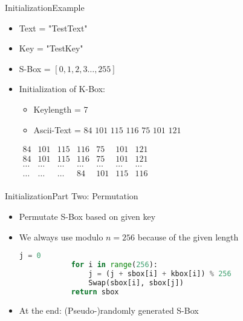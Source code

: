 \documentclass[
	aspectratio=169,	%
	onlytextwidth,		%
	t					%
	]{beamer}
\begin{document}
\begin{frame}{Initialization}{Example}
	\begin{itemize}
		\item Text = "TestText"
		\item Key = "TestKey"
		\item S-Box = $[0, 1, 2, 3 \dots, 255]$
		\item Initialization of K-Box:
		\begin{itemize}
			\item Keylength = 7
			\item Ascii-Text = $84$ $101$ $115$ $116$ $75$ $101$ $121$
		\end{itemize}
		\medskip
		$\begin{array}{|ccccccc|}
		84 & 101 & 115 & 116 & 75 & 101 & 121 \\
		84 & 101 & 115 & 116 & 75 & 101 & 121 \\
		\dots & \dots & \dots & \dots & \dots & \dots & \dots \\
		\dots & \dots & \dots & 84 & 101 & 115 & 116 \\
		\end{array}$
	\end{itemize}
\end{frame}


\begin{frame}[fragile]{Initialization}{Part Two: Permutation}
	\begin{itemize}
		\item Permutate S-Box based on given key
		\item We always use modulo $n = 256$ because of the given length
		\begin{lstlisting}[language=Python]
			j = 0
			for i in range(256):
				j = (j + sbox[i] + kbox[i]) % 256
				Swap(sbox[i], sbox[j])
			return sbox
		\end{lstlisting}
		\item At the end: (Pseudo-)randomly generated S-Box \cite{woungang20192nd}
	\end{itemize}
\end{frame}
\end{document}
